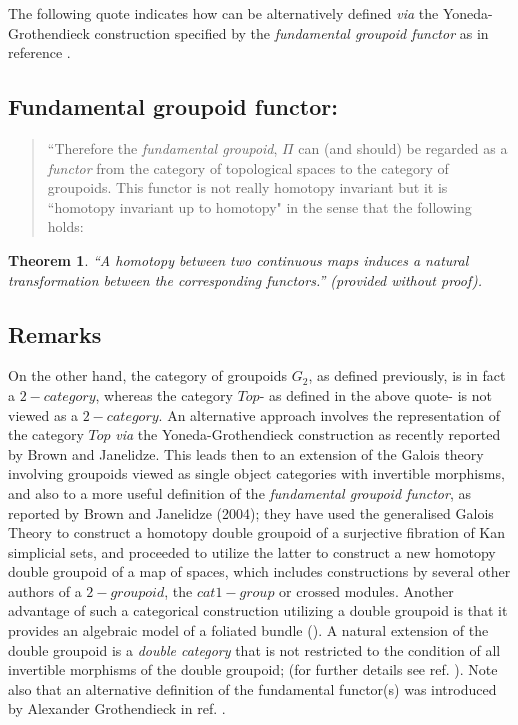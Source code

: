 \documentclass[12pt]{article}
\theoremstyle{plain}
\newtheorem{theorem}{Theorem}[section]
\theoremstyle{definition}
\theoremstyle{plain}
\numberwithin{equation}{section}
\begin{document}
The following quote indicates how  
can be alternatively defined {\em via} the Yoneda-Grothendieck construction specified by
the \emph{fundamental groupoid functor} as in reference \cite{BR-JG2k4}. 

\subsection{Fundamental groupoid functor:}
\begin{quote}
``Therefore the \emph{fundamental groupoid}, $\Pi$ can (and should) be regarded as a {\em functor} from the category of topological spaces to the category of groupoids. This functor is not really homotopy invariant but it is 
``homotopy invariant up to homotopy" in the sense that the following holds: 
\end{quote}


\begin{theorem} 
  ``A homotopy between two continuous maps induces a natural transformation between the corresponding functors.'' 
({\em provided without proof}).
\end{theorem}

\subsection{Remarks}  

 On the other hand, the category of groupoids $G_2$, as defined previously, is in fact a $2-category$, whereas the category \textbf{$Top$}- as defined in the above quote- is not viewed as a $2-category$. An alternative approach involves the representation of the category \textbf{$Top$} {\em via} the Yoneda-Grothendieck construction as recently reported by Brown and Janelidze. This leads then to an extension of the Galois theory involving groupoids viewed as single object categories with invertible morphisms, and also to a more useful definition of the {\em fundamental groupoid functor}, as reported by Brown and Janelidze (2004); they have used the generalised Galois Theory to construct a homotopy double groupoid of a surjective fibration of Kan simplicial sets, and proceeded to utilize the latter to construct a new homotopy double groupoid of a map of spaces, which includes constructions by several other authors of a $2-groupoid$, the $cat1-group$ or crossed modules. Another advantage of such a categorical construction utilizing a double groupoid is that it provides an algebraic model of a foliated bundle (\cite{BR-JG2k4}).
A natural extension of the double groupoid is a \emph{double category} that is not restricted to the condition of all invertible morphisms of the double groupoid; (for further details see ref. \cite{BR-JG2k4}).
Note also that an alternative definition of the fundamental functor(s) was introduced by Alexander Grothendieck 
in ref. \cite{Alex1}. 
\end{document}

